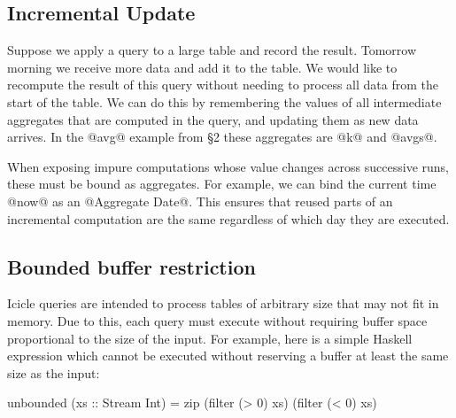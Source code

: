 \subsection{Incremental Update}

Suppose we apply a query to a large table and record the result. Tomorrow morning we receive more data and add it to the table. We would like to recompute the result of this query without needing to process all data from the start of the table. We can do this by remembering the values of all intermediate aggregates that are computed in the query, and updating them as new data arrives. In the @avg@ example from \S2 these aggregates are @k@ and @avgs@. 

When exposing impure computations whose value changes across successive runs, these must be bound as aggregates.
For example, we can bind the current time @now@ as an @Aggregate Date@.
This ensures that reused parts of an incremental computation are the same regardless of which day they are executed.





\subsection{Bounded buffer restriction}
\label{s:IcicleSource:bounded}
Icicle queries are intended to process tables of arbitrary size that may not fit in memory. Due to this, each query must execute without requiring buffer space proportional to the size of the input. For example, here is a simple Haskell expression which cannot be executed without reserving a buffer at least the same size as the input:
\begin{code}
    unbounded (xs :: Stream Int)
     = zip (filter (> 0) xs) (filter (< 0) xs)
\end{code}

